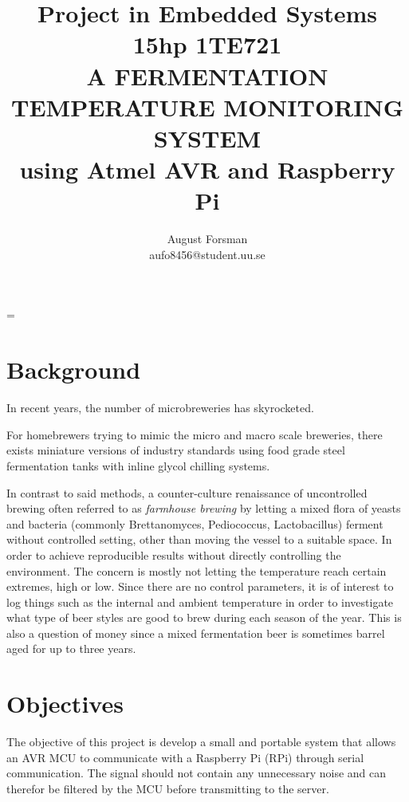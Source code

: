 \documentclass[10pt]{article}
\title{\renewcommand{\baselinestretch}{1.17}\normalsize\bf%
  Project in Embedded Systems 15hp 1TE721\\
  \vspace{2mm}
  \uppercase{A fermentation temperature monitoring system}\\
  using Atmel AVR and Raspberry Pi\\
}
\author{%
  August Forsman\\
  \small aufo8456@student.uu.se
}
\begin{document}
\date{}

\maketitle

\vspace{-0.5cm}



\baselineskip=\normalbaselineskip

\section*{Background}%
\label{sec:background}
In recent years, the number of microbreweries has skyrocketed. 

For homebrewers trying to mimic the micro and macro scale breweries, there exists miniature versions of industry standards using food grade steel fermentation tanks with inline glycol chilling systems. 

In contrast to said methods, a counter-culture renaissance of uncontrolled brewing often referred to as 
\textit{farmhouse brewing} by letting a mixed flora of yeasts and bacteria (commonly Brettanomyces, Pediococcus, Lactobacillus) ferment without controlled setting, other than moving the vessel to a suitable space. In order to achieve reproducible results without directly controlling the environment. The concern is mostly not letting the temperature reach certain extremes, high or low. Since there are no control parameters, it is of interest to log things such as the internal and ambient temperature in order to investigate what type of beer styles are good to brew during each season of the year. This is also a question of money since a mixed fermentation beer is sometimes barrel aged for up to three years.
\section*{Objectives}%
\label{sec:objectives}
The objective of this project is develop a small and portable system that allows an AVR MCU to communicate with a Raspberry Pi (RPi) through serial communication. The signal should not contain any unnecessary noise and can therefor be filtered by the MCU before transmitting to the server.
\end{document}

